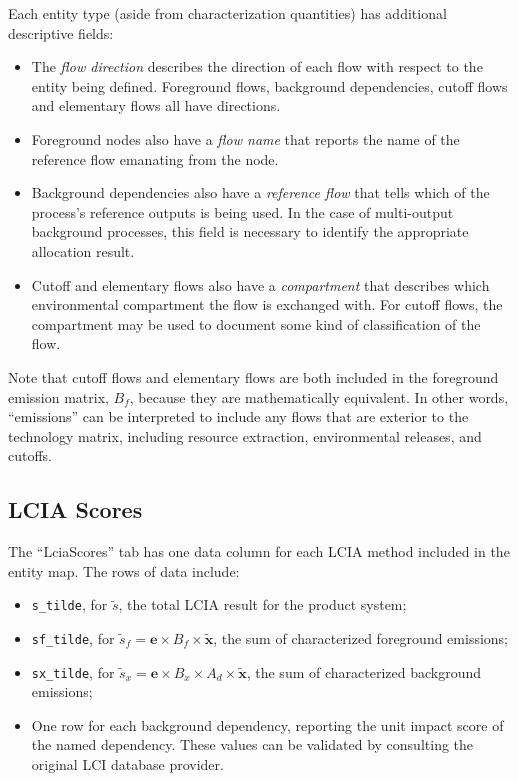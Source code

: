Each entity type (aside from characterization quantities) has additional descriptive fields:
\begin{itemize}
\item The \emph{flow direction} describes the direction of each flow with respect to the entity being defined.  Foreground flows, background dependencies, cutoff flows and elementary flows all have directions.
\item Foreground nodes also have a \emph{flow name} that reports the name of the reference flow emanating from the node.
\item Background dependencies also have a \emph{reference flow} that tells which of the process's reference outputs is being used.  In the case of multi-output background processes, this field is necessary to identify the appropriate allocation result.
  \item Cutoff and elementary flows also have a \emph{compartment} that describes which environmental compartment the flow is exchanged with. For cutoff flows, the compartment may be used to document some kind of classification of the flow.
\end{itemize}
Note that cutoff flows and elementary flows are both included in the foreground emission matrix, $B_f$, because they are mathematically equivalent.  In other words, ``emissions'' can be interpreted to include any flows that are exterior to the technology matrix, including resource extraction, environmental releases, and cutoffs.

\subsection{LCIA Scores}

The ``LciaScores'' tab has one data column for each LCIA method included in the entity map.  The rows of data include:
\begin{itemize}
\item \texttt{s\_tilde}, for $\tilde{s}$, the total LCIA result for the product system;
\item \texttt{sf\_tilde}, for $\tilde{s}_f = \mathbf{e}\times B_f \times \tilde{\mathbf{x}}$, the sum of characterized foreground emissions;
\item \texttt{sx\_tilde}, for $\tilde{s}_x = \mathbf{e}\times B_x \times A_d \times \tilde{\mathbf{x}}$, the sum of characterized background emissions;
  \item One row for each background dependency, reporting the unit impact score of the named dependency. These values can be validated by consulting the original LCI database provider.
\end{itemize}

